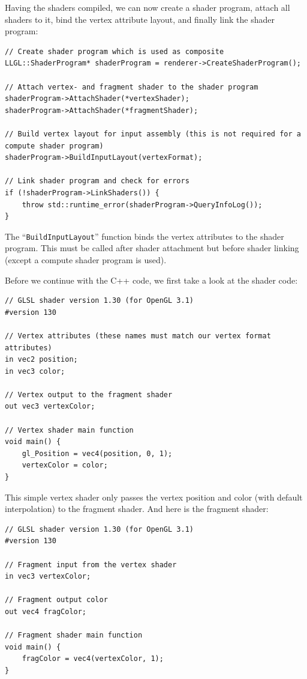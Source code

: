 \documentclass{article}
\begin{document}
Having the shaders compiled, we can now create a shader program, attach all shaders to it,
bind the vertex attribute layout, and finally link the shader program:
\begin{lstlisting}
// Create shader program which is used as composite
LLGL::ShaderProgram* shaderProgram = renderer->CreateShaderProgram();

// Attach vertex- and fragment shader to the shader program
shaderProgram->AttachShader(*vertexShader);
shaderProgram->AttachShader(*fragmentShader);

// Build vertex layout for input assembly (this is not required for a compute shader program)
shaderProgram->BuildInputLayout(vertexFormat);

// Link shader program and check for errors
if (!shaderProgram->LinkShaders()) {
    throw std::runtime_error(shaderProgram->QueryInfoLog());
}
\end{lstlisting}
The ``\texttt{BuildInputLayout}'' function binds the vertex attributes to the shader program.
This must be called after shader attachment but before shader linking (except a compute shader program is used).

Before we continue with the C++ code, we first take a look at the shader code:
\begin{lstlisting}[title={\texttt{vertex.glsl}}]
// GLSL shader version 1.30 (for OpenGL 3.1)
#version 130

// Vertex attributes (these names must match our vertex format attributes)
in vec2 position;
in vec3 color;

// Vertex output to the fragment shader
out vec3 vertexColor;

// Vertex shader main function
void main() {
    gl_Position = vec4(position, 0, 1);
    vertexColor = color;
}
\end{lstlisting}
This simple vertex shader only passes the vertex position and color (with default interpolation) to the fragment shader.
And here is the fragment shader:
\begin{lstlisting}[title={\texttt{fragment.glsl}}]
// GLSL shader version 1.30 (for OpenGL 3.1)
#version 130

// Fragment input from the vertex shader
in vec3 vertexColor;

// Fragment output color
out vec4 fragColor;

// Fragment shader main function
void main() {
    fragColor = vec4(vertexColor, 1);
}
\end{lstlisting}
\end{document}
